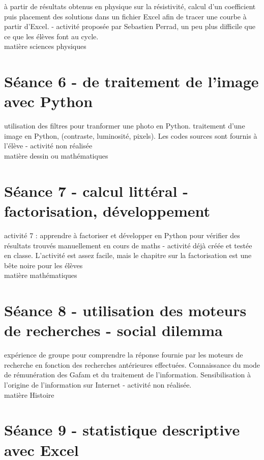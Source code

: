 \documentclass{moncours}
\begin{document}
à partir de résultats obtenus en physique sur la résistivité, calcul d'un coefficient puis placement des solutions dans un fichier Excel afin de tracer une courbe à partir d'Excel. - activité proposée par Sebastien Perrad, un peu plus difficile que ce que les élèves font au cycle.\\

matière sciences physiques

\section{Séance 6 - de traitement de l'image avec Python}

utilisation des filtres pour tranformer une photo en Python. traitement d'une image en Python, (contraste, luminosité, pixels). Les codes sources sont fournis à l'élève - activité non réalisée\\

 matière dessin ou mathématiques

\section{Séance 7 - calcul littéral - factorisation, développement}

activité 7 : apprendre à factoriser et développer en Python pour vérifier des résultats trouvés manuellement en cours de maths - activité déjà créée et testée en classe. L'activité est assez facile, mais le chapitre sur la factorisation est une bête noire pour les élèves\\

matière mathématiques


\section{Séance 8 - utilisation des moteurs de recherches - social dilemma}

expérience de groupe pour comprendre la réponse fournie par les moteurs de recherche en fonction des recherches antérieures effectuées. Connaissance du mode de rémunération des Gafam et du traitement de l'information. Sensibilisation à l'origine de l'information sur Internet - activité non réalisée.\\

matière Histoire


\section{Séance 9 - statistique descriptive avec Excel}
\end{document}
